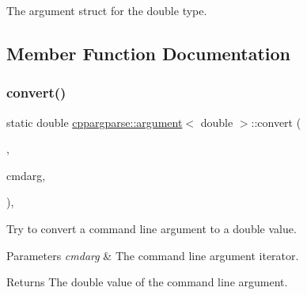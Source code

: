 The argument struct for the double type. 

\subsection{Member Function Documentation}
\mbox{\label{structcppargparse_1_1argument_3_01double_01_4_a9d3b588191523c720868cd72e05b6261}} 
\subsubsection{\texorpdfstring{convert()}{convert()}}
{\footnotesize\ttfamily static double \hyperlink{structcppargparse_1_1argument}{cppargparse\+::argument}$<$ double $>$\+::convert (\begin{DoxyParamCaption}\item[{const types\+::\+Command\+Line\+\_\+t \&}]{,  }\item[{const types\+::\+Command\+Line\+Argument\+\_\+t \&}]{cmdarg,  }\item[{const types\+::\+Command\+Line\+Arguments\+Map\+\_\+t \&}]{ }\end{DoxyParamCaption})\hspace{0.3cm}{\ttfamily [inline]}, {\ttfamily [static]}}



Try to convert a command line argument to a double value. 


\begin{DoxyParams}{Parameters}
{\em cmdarg} & The command line argument iterator.\\
\hline
\end{DoxyParams}
\begin{DoxyReturn}{Returns}
The double value of the command line argument. 
\end{DoxyReturn}
\mbox{\label{structcppargparse_1_1argument_3_01double_01_4_afc18801cd4a57b636d65d8e223482f45}} 
